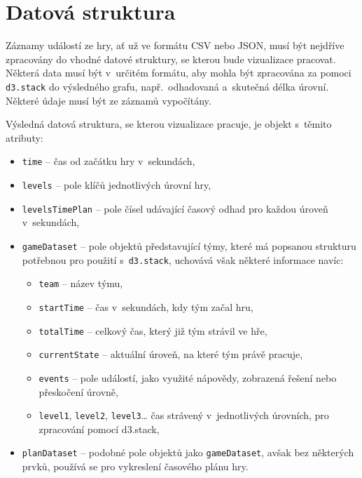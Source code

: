 \documentclass[
  digital, %
  oneside, %
  table,   %
  nolof,     %
  nolot,     %
  nocover
]{fithesis3}
\begin{document}
\section{Datová struktura}
Záznamy událostí ze hry, ať už ve formátu CSV nebo JSON, musí být nejdříve zpracovány do vhodné datové struktury, se kterou bude vizualizace pracovat. Některá data musí být v~určitém formátu, aby mohla být zpracována za pomoci \verb|d3.stack| do výsledného grafu, např.~odhadovaná a~skutečná délka úrovní. Některé údaje musí být ze záznamů vypočítány.\par
Výsledná datová struktura, se kterou vizualizace pracuje, je objekt s~těmito atributy:
\begin{itemize}
  \item \verb|time| – čas od začátku hry v~sekundách,
  \item \verb|levels| – pole klíčů jednotlivých úrovní hry,
  \item \verb|levelsTimePlan| – pole čísel udávající časový odhad pro každou úroveň v~sekundách,
  \item \verb|gameDataset| – pole objektů představující týmy, které má popsanou strukturu potřebnou pro použití s~\verb|d3.stack|, uchovává však některé informace navíc:
  	\begin{itemize}
		\item \verb|team| – název týmu,
		\item \verb|startTime| – čas v~sekundách, kdy tým začal hru,
		\item \verb|totalTime| – celkový čas, který již tým strávil ve hře,
		\item \verb|currentState| – aktuální úroveň, na které tým právě pracuje,
		\item \verb|events| – pole událostí, jako využité nápovědy, zobrazená řešení nebo přeskočení úrovně,
		\item \verb|level1|, \verb|level2|, \verb|level3|… čas strávený v~jednotlivých úrovních, pro zpracování pomocí d3.stack,
	\end{itemize}
  \item \verb|planDataset| – podobné pole objektů jako \verb|gameDataset|, avšak bez některých prvků, používá se pro vykreslení časového plánu hry.
\end{itemize}
\end{document}
